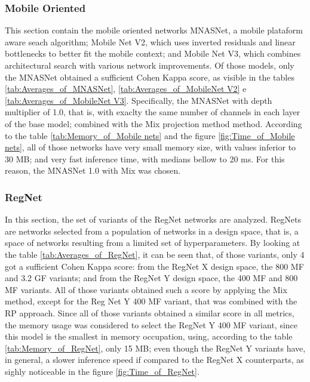 
\FloatBarrier

\subsubsection{Mobile Oriented}

This section contain the mobile oriented networks MNASNet, a mobile plataform aware seach algorithm; Mobile Net V2, which uses inverted residuals and linear bottlenecks to better fit the mobile context; and Mobile Net V3, which combines architectural search with various network improvements. Of those models, only the MNASNet obtained a sufficient Cohen Kappa score, as visible in the tables \ref{tab:Averages_of_MNASNet}, \ref{tab:Averages_of_MobileNet V2} e \ref{tab:Averages_of_MobileNet V3}. Specifically, the MNASNet with depth multiplier of 1.0, that is, with exaclty the same number of channels in each layer of the base model; combined with the \acrshort{Mix} projection method method. According to the table \ref{tab:Memory_of_Mobile nets} and the figure \ref{fig:Time_of_Mobile nets}, all of those networks have very small memory size, with values inferior to 30 MB; and very fast inference time, with medians bellow to 20 ms. For this reason, the MNASNet 1.0 with \acrshort{Mix} was chosen. 






\FloatBarrier

\subsubsection{RegNet}

In this section, the set of variants of the RegNet networks are analyzed. RegNets are networks selected from a population of networks in a design space, that is, a space of networks resulting from a limited set of hyperparameters. By looking at the table \ref{tab:Averages_of_RegNet}, it can be seen that, of those variants, only 4 got a sufficient Cohen Kappa score: from the RegNet X design space, the 800 MF and 3.2 GF variants; and from the RegNet Y design space, the 400 MF and 800 MF variants. All of those variants obtained such a score by applying the \acrshort{Mix} method, except for the Reg Net Y 400 MF variant, that was combined with the \acrshort{RP} approach. Since all of those variants obtained a similar score in all metrics, the memory usage was considered to select the RegNet Y 400 MF variant, since this model is the smallest in memory occupation, using, according to the table \ref{tab:Memory_of_RegNet}, only 15 MB; even though the RegNet Y variants have, in general, a slower inference speed if compared to the RegNet X counterparts, as sighly noticeable in the figure \ref{fig:Time_of_RegNet}.

